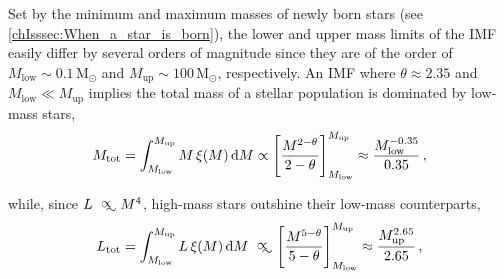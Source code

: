 Set by the minimum and maximum masses of newly born stars (see \cref{chIsssec:When_a_star_is_born}), the lower and upper mass limits of the IMF easily differ by several orders of magnitude since they are of the order of $M_\text{low} \sim 0.1 \, \mathrm{M_\odot}$ and $M_\text{up} \sim 100 \, \mathrm{M_\odot}$, respectively. An IMF where $\theta \approx 2.35$ and $M_\text{low} \ll M_\text{up}$ implies the total mass of a stellar population is dominated by low-mass stars,
\begin{equation}
    \label{chIeq:IMF_mass}
    M_\text{tot} = \int_{M_\text{low}}^{M_\text{up}} M \, \xi (M) \dif M \propto \left[ \frac{M^{2-\theta}}{2-\theta} \right]_{M_\text{low}}^{M_\text{up}} \approx \frac{M_\text{low}^{-0.35}}{0.35} \, ,
\end{equation}

\noindent while, since $L \appropto M^4$, high-mass stars outshine their low-mass counterparts,
\begin{equation}
    \label{chIeq:IMF_luminosity}
    L_\text{tot} = \int_{M_\text{low}}^{M_\text{up}} L \, \xi (M) \dif M \appropto \left[ \frac{M^{5-\theta}}{5-\theta} \right]_{M_\text{low}}^{M_\text{up}} \approx \frac{M_\text{up}^{2.65}}{2.65} \, ,
\end{equation}

